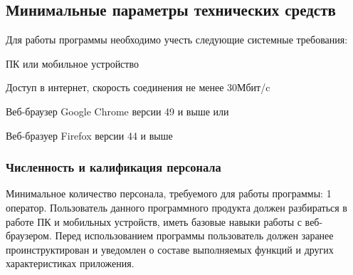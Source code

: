 \subsection{Минимальные параметры технических средств}
Для работы программы необходимо учесть следующие системные требования:
\begin{my_enumerate}
  \item ПК или мобильное устройство
  \item Доступ в интернет, скорость соединения не менее 30Мбит/c
  \item Веб-браузер Google Chrome версии 49 и выше или
  \item Веб-бразуер Firefox версии 44 и выше
\end{my_enumerate}

\subsubsection{Численность и калификация персонала}
Минимальное количество персонала, требуемого для работы программы: 1 оператор.
Пользователь данного программного продукта должен разбираться в работе
ПК и мобильных устройств, иметь базовые навыки работы с веб-браузером.
Перед использованием программы пользователь должен заранее проинструктирован и
уведомлен о составе выполняемых функций и других характеристиках приложения.

